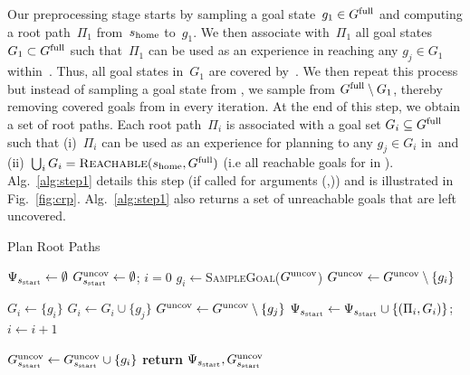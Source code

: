 \documentclass[conference]{IEEEtran}
\begin{document}
Our preprocessing stage starts by sampling a goal state~$g_1 \in G^{\textrm{full}}$ and computing a root path~$\Pi_1$ from~$s_{\textrm{home}}$ to~$g_1$. We then associate with~$\Pi_1$ all goal states~$G_1 \subset G^{\textrm{full}}$ such that~$\Pi_1$ can be used as an experience in reaching any $g_j \in G_1$ within~\Tbound.
Thus, all goal states in~$G_1$ are covered by~\Shome.
%
We then repeat this process but instead of sampling  a goal state from \Gfull, we sample from $G^{\textrm{full}} \setminus G_1$, thereby removing covered goals from \Gfull in every iteration.
At the end of this step, we obtain a set of root paths. 
Each root path~$\Pi_i$ is associated with a goal set $G_i \subseteq G^{\textrm{full}}$ such that 
(i)~$\Pi_i$ can be used as an experience for planning to any $g_j \in G_i$ in~\Tbound and 
(ii)~$\bigcup_i G_i = \textsc{Reachable}(s_{\textrm{home}}, G^{\textrm{full}})$ (i.e all reachable goals for \Shome in \Gfull).
%
Alg.~\ref{alg:step1} details this step (if called for arguments (\Shome,\Gfull)) and is illustrated in Fig.~\ref{fig:crp}. Alg.~\ref{alg:step1} also returns a set of unreachable goals that are left uncovered.




\begin{algorithm}[t]
\caption{Plan Root Paths}
\label{alg:step1}
    \AlgFontSize
\begin{algorithmic}[1]
\State $\Psi_{s_{\textrm{start}}} \leftarrow \emptyset$   
\State $G^{\textrm{uncov}}_{s_{\textrm{start}}} \leftarrow \emptyset$; \hspace{3mm}
       $i = 0$
\While{$\Guncov \neq \emptyset$}
    \State $g_i \leftarrow$\textsc{SampleGoal}($G^{\textrm{uncov}}$)
    \State $G^{\textrm{uncov}} \leftarrow G^{\textrm{uncov}} \setminus \{g_i\}$
    
     
        \State $G_i \leftarrow \{ g_i \}$	
                \State $G_i \leftarrow G_i \cup \{g_j\}$
                \State $G^{\textrm{uncov}} \leftarrow G^{\textrm{uncov}} \setminus \{g_j\}$
            \EndIf
        \EndFor
        \State $\Psi_{s_{\textrm{start}}} \leftarrow \Psi_{s_{\textrm{start}}} \cup \{ (\Pi_i, G_i)\}$; \hspace{3mm}
        $i \leftarrow i + 1$
        
    \Else
        \State $G^{\textrm{uncov}}_{s_{\textrm{start}}} \leftarrow G^{\textrm{uncov}}_{s_{\textrm{start}}} \cup \{g_i\}$ 
    \EndIf
\EndWhile
\State \textbf{return} $\Psi_{s_{\textrm{start}}}, G^{\textrm{uncov}}_{s_{\textrm{start}}}$
\EndProcedure
\end{algorithmic}
\end{algorithm}
\end{document}
